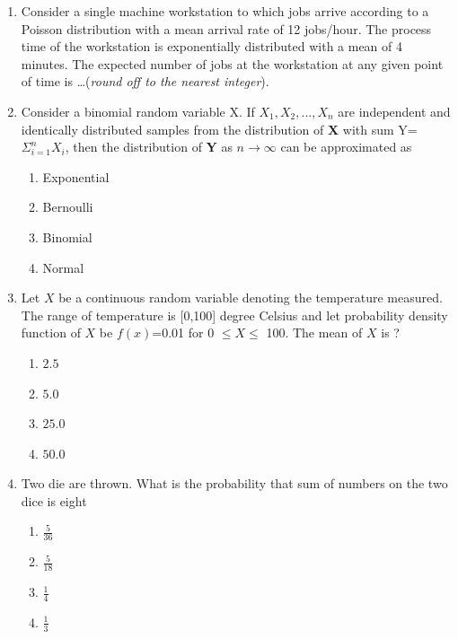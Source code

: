 \documentclass[journal,12pt,twocolumn]{IEEEtran}
\begin{document}
\begin{enumerate}
%
\solution

%
\item  Consider a single machine workstation to which jobs arrive according to a
Poisson distribution with a mean arrival rate of 12 jobs/hour. The process
time of the workstation is exponentially distributed with a mean of 4
minutes. The expected number of jobs at the workstation at any given
point of time is \ldots (\textit{round off to the nearest integer}).
%
\solution

%
\item Consider a binomial random variable X. If \textbf{$X_1,X_2,...,X_n$} are independent and identically distributed samples from the distribution of \textbf{X} with sum Y=$\Sigma_{i=1}^n X_i$, then the distribution of \textbf{Y} as $n\rightarrow \infty$ can be approximated as
\begin{enumerate}
    \item Exponential
    \item Bernoulli 
    \item Binomial
    \item Normal
\end{enumerate}
%
\solution

%
\item Let \(X\) be a continuous random variable denoting the temperature measured. The range of temperature is [0,100] degree Celsius and let probability density function of \(X\) be \(f(x)\)=0.01 for 0 \(\leq X \leq\) 100.\newline
The mean of \(X\) is ?\newline
%
\begin{enumerate}[label=(\Alph*)]
    \item \(2.5\)
    \item \(5.0\)
    \item \(25.0\)
    \item \(50.0\)
\end{enumerate}
%
\solution

%
\item Two die are thrown. What is the probability that sum of numbers on the two dice is eight \\
\begin{enumerate}[label=(\alph*)]
\item $\frac{5}{36}$\\
\item $\frac{5}{18}$ \\
\item$\frac{1}{4}$\\
\item$\frac{1}{3}$

\end{enumerate}
\end{enumerate}
\end{document}

